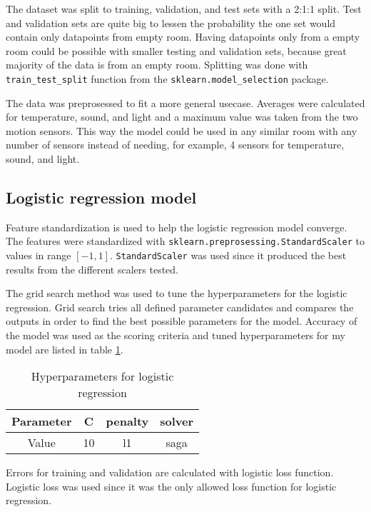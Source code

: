 \documentclass[11pt]{article}
\begin{document}
The dataset was split to training, validation, and test sets with a 2:1:1 split. 
Test and validation sets are quite big to lessen the probability the one set would contain only datapoints from empty room.
Having datapoints only from a empty room could be possible with smaller testing and validation sets, because great majority of the data is from an empty room.
Splitting was done with \texttt{train\_test\_split} function from the \texttt{sklearn.model\_selection} package.

The data was preprosessed to fit a more general usecase. 
Averages were calculated for temperature, sound, and light and a maximum value was taken from the two motion sensors.
This way the model could be used in any similar room with any number of sensors instead of needing, for example, 4 sensors for temperature, sound, and light.

\subsection{Logistic regression model}

Feature standardization is used to help the logistic regression model converge.
The features were standardized with \texttt{sklearn.preprosessing.StandardScaler} to values in range $[-1, 1]$.
\texttt{StandardScaler} was used since it produced the best results from the different scalers tested.

The grid search method was used to tune the hyperparameters for the logistic regression. 
Grid search tries all defined parameter candidates and compares the outputs in order to find the best possible parameters for the model.
Accuracy of the model was used as the scoring criteria and tuned hyperparameters for my model are listed in table \ref{table:1}.
\begin{table}[h]
    \centering
    \begin{tabular}{ | c | c | c | c | }
        \hline
        Parameter & C & penalty & solver \\
        \hline
        Value & 10 & l1 & saga \\
        \hline
    \end{tabular}
    \caption{Hyperparameters for logistic regression}
    \label{table:1}
\end{table}

Errors for training and validation are calculated with logistic loss function. 
Logistic loss was used since it was the only allowed loss function for logistic regression.
\end{document}
